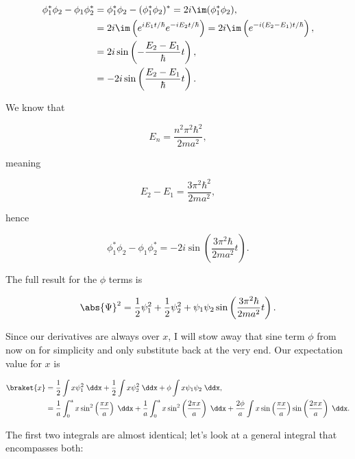 \begin{align*}
    \phi_1^*\phi_2 - \phi_1\phi_2^* &= \phi_1^*\phi_2 - (\phi_1^*\phi_2)^* = 2i\im(\phi_1^*\phi_2), \\
    &= 2i\im\left(e^{iE_1t/\hbar}e^{-iE_2t/\hbar}\right) = 2i\im\left( e^{-i(E_2-E_1)t/\hbar} \right), \\
    &= 2i \sin\left( -\frac{E_2-E_1}{\hbar}t \right), \\
    &= -2i \sin\left( \frac{E_2-E_1}{\hbar}t \right).
\end{align*}


We know that 

\begin{equation*}
    E_n = \frac{n^2\pi^2\hbar^2}{2ma^2},
\end{equation*}

meaning

\begin{equation*}
    E_2-E_1 = \frac{3\pi^2\hbar^2}{2ma^2},
\end{equation*}

hence

\begin{equation*}
    \phi_1^*\phi_2 - \phi_1\phi_2^* = -2i\sin\left( \frac{3\pi^2\hbar}{2ma^2}t \right).
\end{equation*}

The full result for the $\phi$ terms is

\begin{equation*}
    \abs{\Psi}^2 = \frac{1}{2}\psi_1^2 + \frac{1}{2}\psi_2^2 + \psi_1\psi_2\sin\left( \frac{3\pi^2\hbar}{2ma^2}t \right).
\end{equation*}

Since our derivatives are always over $x$, I will stow away that sine term $\phi$ from now on for simplicity and only substitute back at the very end. Our expectation value for $x$ is

\begin{align*}
    \braket{x} &= \frac{1}{2}\int x\psi_1^2 \;\ddx + \frac{1}{2}\int x\psi_2^2 \;\ddx + \phi \int x\psi_1\psi_2 \;\ddx, \\
    &= \frac{1}{a}\int_0^a x\sin^2\left( \frac{\pi x}{a} \right)\;\ddx + \frac{1}{a}\int_0^a x\sin^2\left( \frac{2\pi x}{a} \right)\;\ddx + \frac{2\phi}{a}\int x\sin\left( \frac{\pi x}{a} \right)\sin\left( \frac{2\pi x}{a} \right) \;\ddx.
\end{align*}

The first two integrals are almost identical; let's look at a general integral that encompasses both:

